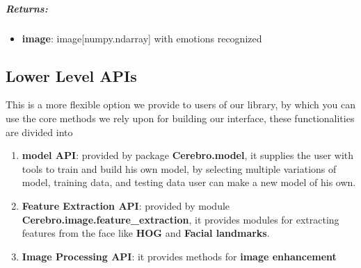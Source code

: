 \subparagraph{Returns:}
\begin{changemargin}{0.5cm}{0cm}
\begin{itemize}[noitemsep,nolistsep]
	\item \textbf{image}: image[numpy.ndarray] with emotions recognized 
\end{itemize}
\end{changemargin}

\begin{comment}
\subparagraph{Usage:}
\begin{changemargin}{0.5cm}{0cm}
\begin{itemize}
	\item import the module:
	\begin{lstlisting}[language=Python]
	from interface Import process_image as pi\end{lstlisting}
	
	\item call it:
	\begin{lstlisting}[language=Python]
	pi.mark_faces_emotions(image)\end{lstlisting}
\end{itemize}
\end{changemargin}
\end{comment}

\subsection{Lower Level APIs}
This is a more flexible option we provide to users of our library, by which you can use the core methods we rely upon for building our interface, these functionalities are divided into
\begin{enumerate}
	\item \textbf{model API}: provided by package \textbf{Cerebro.model}, it supplies the user with tools to train and build his own model, by selecting multiple variations of model, training data, and testing data user can make a new model of his own. 
	\item \textbf{Feature Extraction API}: provided by module \textbf{Cerebro.image.feature\_extraction}, it provides modules for extracting features from the face like \textbf{HOG} and \textbf{Facial landmarks}.
	\item \textbf{Image Processing API}: it provides methods for \textbf{image enhancement}
\end{enumerate}

